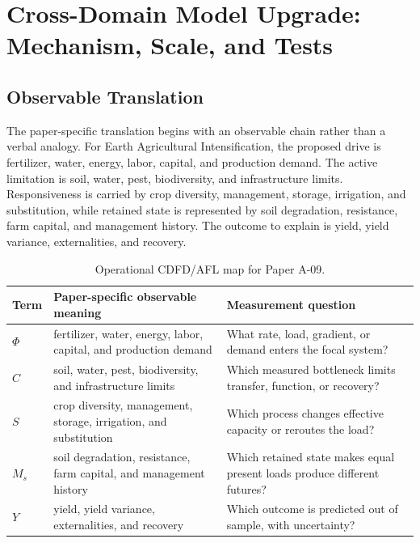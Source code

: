 \documentclass[11pt,a4paper]{article}
\begin{document}
\section{Cross-Domain Model Upgrade: Mechanism, Scale, and Tests}

\subsection{Observable Translation}

The paper-specific translation begins with an observable chain rather than a
verbal analogy. For Earth Agricultural Intensification, the proposed drive is fertilizer, water, energy, labor, capital, and production demand.
The active limitation is soil, water, pest, biodiversity, and infrastructure limits. Responsiveness is carried by
crop diversity, management, storage, irrigation, and substitution, while retained state is represented by
soil degradation, resistance, farm capital, and management history. The outcome to explain is yield, yield variance, externalities, and recovery.

\begin{table}[htbp]
\centering
\small
\caption{Operational CDFD/AFL map for Paper A-09.}
\begin{tabularx}{\textwidth}{|l|X|X|}
\hline
\textbf{Term} & \textbf{Paper-specific observable meaning} & \textbf{Measurement question} \\
\hline
$\Phi$ & fertilizer, water, energy, labor, capital, and production demand & What rate, load, gradient, or demand enters the focal system? \\
\hline
$C$ & soil, water, pest, biodiversity, and infrastructure limits & Which measured bottleneck limits transfer, function, or recovery? \\
\hline
$S$ & crop diversity, management, storage, irrigation, and substitution & Which process changes effective capacity or reroutes the load? \\
\hline
$M_s$ & soil degradation, resistance, farm capital, and management history & Which retained state makes equal present loads produce different futures? \\
\hline
$Y$ & yield, yield variance, externalities, and recovery & Which outcome is predicted out of sample, with uncertainty? \\
\hline
\end{tabularx}
\end{table}
\end{document}
